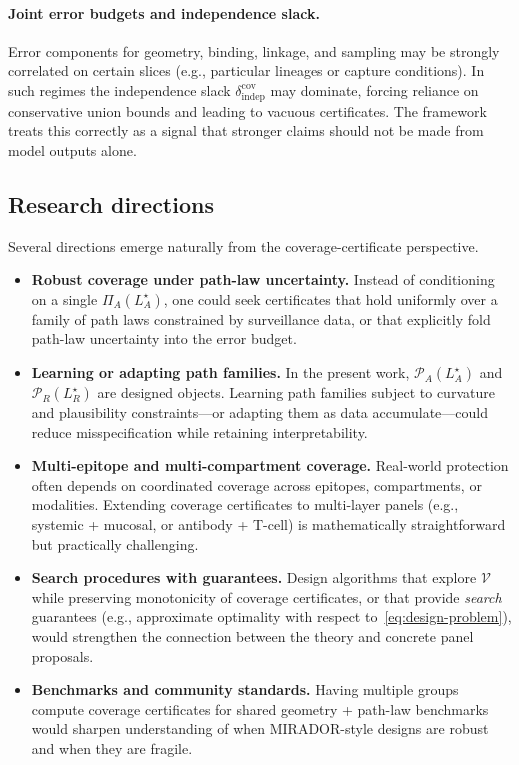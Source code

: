\documentclass[11pt]{article}
\begin{document}
\paragraph{Joint error budgets and independence slack.}
Error components for geometry, binding, linkage, and sampling may be strongly correlated on certain
slices (e.g., particular lineages or capture conditions). In such regimes the independence slack
$\delta_{\mathrm{indep}}^{\mathrm{cov}}$ may dominate, forcing reliance on conservative union bounds and
leading to vacuous certificates. The framework treats this correctly as a signal that stronger claims
should not be made from model outputs alone.

\subsection{Research directions}

Several directions emerge naturally from the coverage-certificate perspective.

\begin{itemize}
  \item \textbf{Robust coverage under path-law uncertainty.}
  Instead of conditioning on a single $\Pi_A(L_A^\star)$, one could seek certificates that hold
  uniformly over a family of path laws constrained by surveillance data, or that explicitly fold
  path-law uncertainty into the error budget.

  \item \textbf{Learning or adapting path families.}
  In the present work, $\mathcal{P}_A(L_A^\star)$ and $\mathcal{P}_R(L_R^\star)$ are designed
  objects. Learning path families subject to curvature and plausibility constraints---or adapting
  them as data accumulate---could reduce misspecification while retaining interpretability.

  \item \textbf{Multi-epitope and multi-compartment coverage.}
  Real-world protection often depends on coordinated coverage across epitopes, compartments, or
  modalities. Extending coverage certificates to multi-layer panels (e.g., systemic + mucosal, or
  antibody + T-cell) is mathematically straightforward but practically challenging.

  \item \textbf{Search procedures with guarantees.}
  Design algorithms that explore $\mathcal{V}$ while preserving monotonicity of coverage
  certificates, or that provide \emph{search} guarantees (e.g., approximate optimality with respect
  to~\eqref{eq:design-problem}), would strengthen the connection between the theory and concrete
  panel proposals.

  \item \textbf{Benchmarks and community standards.}
  Having multiple groups compute coverage certificates for shared geometry + path-law benchmarks
  would sharpen understanding of when MIRADOR-style designs are robust and when they are fragile.
\end{itemize}
\end{document}
